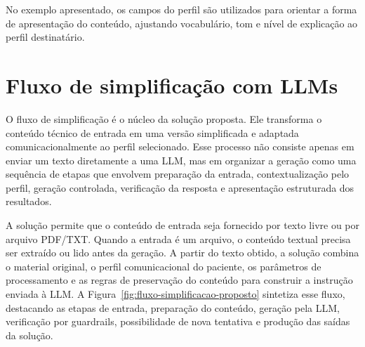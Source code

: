 No exemplo apresentado, os campos do perfil são utilizados para orientar a forma de apresentação do conteúdo, ajustando vocabulário, tom e nível de explicação ao perfil destinatário.

\section{Fluxo de simplificação com LLMs}
\label{sec:fluxo-simplificacao-llms}

O fluxo de simplificação é o núcleo da solução proposta. Ele transforma o conteúdo técnico de entrada em uma versão simplificada e adaptada comunicacionalmente ao perfil selecionado. Esse processo não consiste apenas em enviar um texto diretamente a uma LLM, mas em organizar a geração como uma sequência de etapas que envolvem preparação da entrada, contextualização pelo perfil, geração controlada, verificação da resposta e apresentação estruturada dos resultados.

A solução permite que o conteúdo de entrada seja fornecido por texto livre ou por arquivo PDF/TXT. Quando a entrada é um arquivo, o conteúdo textual precisa ser extraído ou lido antes da geração. A partir do texto obtido, a solução combina o material original, o perfil comunicacional do paciente, os parâmetros de processamento e as regras de preservação do conteúdo para construir a instrução enviada à LLM. A Figura~\ref{fig:fluxo-simplificacao-proposto} sintetiza esse fluxo, destacando as etapas de entrada, preparação do conteúdo, geração pela LLM, verificação por guardrails, possibilidade de nova tentativa e produção das saídas da solução.

